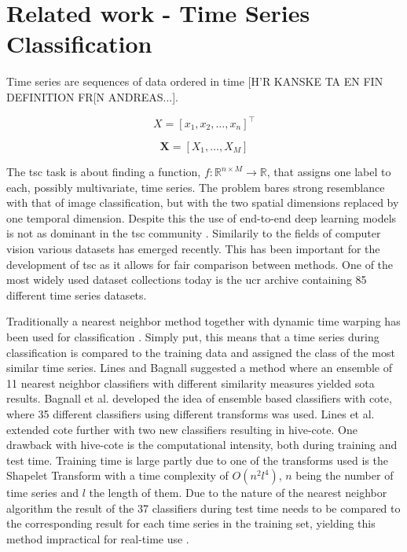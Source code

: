 \chapter{Related work - Time Series Classification} \label{sec:tsc}
Time series are sequences of data ordered in time [H'R KANSKE TA EN FIN DEFINITION FR[N ANDREAS...].

\begin{definition}
  $$X = \left[x_1, x_2, \hdots, x_n\right]^\intercal$$
  \label{def:uts}
\end{definition}

\begin{definition}
    $$\pmb{X} = \left[X_1, \hdots, X_M\right]$$
\end{definition}

The \gls{tsc} task is about finding a function, $f: \mathbb{R}^{n \times M} \rightarrow \mathbb{R}$, that assigns one label to each, possibly multivariate, time series. The problem bares strong resemblance with that of image classification, but with the two spatial dimensions replaced by one temporal dimension. Despite this the use of end-to-end deep learning models is not as dominant in the \gls{tsc} community \cite{IsmailFawaz2019}. Similarily to the fields of computer vision various datasets has emerged recently. This has been important for the development of \gls{tsc} as it allows for fair comparison between methods. One of the most widely used dataset collections today is the \gls{ucr} archive \cite{Dau2018} containing 85 different time series datasets.

Traditionally a nearest neighbor method together with dynamic time warping has been used for classification \cite{Bagnall2017}. Simply put, this means that a time series during classification is compared to the training data and assigned the class of the most similar time series. Lines and Bagnall suggested a method where an ensemble of 11 nearest neighbor classifiers with different similarity measures \cite{Lines2015} yielded \gls{sota} results. Bagnall et al. \cite{Bagnall2015} developed the idea of ensemble based classifiers with \gls{cote}, where 35 different classifiers using different transforms was used. Lines et al. \cite{Lines2016} extended \gls{cote} further with two new classifiers resulting in \gls{hive-cote}. One drawback with \gls{hive-cote} is the computational intensity, both during training and test time. Training time is large partly due to one of the transforms used is the Shapelet Transform with a time complexity of $O(n^2l^4)$, $n$ being the number of time series and $l$ the length of them. Due to the nature of the nearest neighbor algorithm the result of the 37 classifiers during test time needs to be compared to the corresponding result for each time series in the training set, yielding this method impractical for real-time use \cite{IsmailFawaz2019}.

